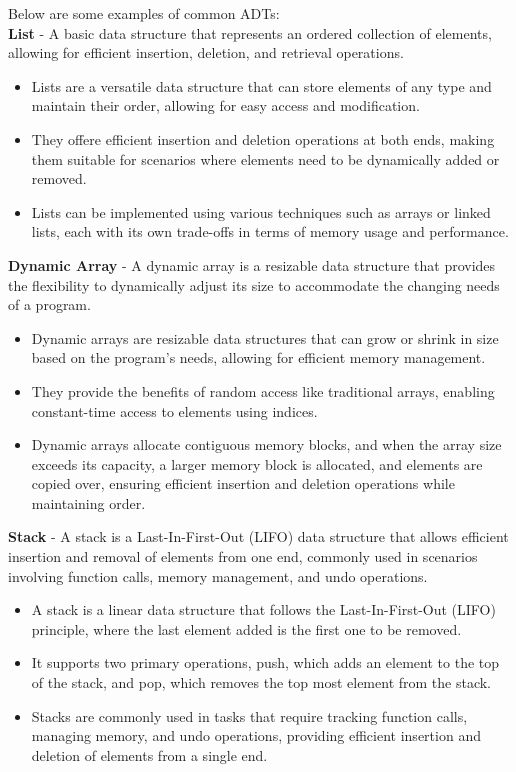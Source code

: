 \begin{solution}
    Below are some examples of common ADTs: \\

    \noindent \textbf{List} - A basic data structure that represents an ordered collection of elements, allowing for efficient insertion, deletion, and retrieval operations.
    \begin{itemize}
        \item Lists are a versatile data structure that can store elements of any type and maintain their order, allowing for easy access and modification.
        \item They offere efficient insertion and deletion operations at both ends, making them suitable for scenarios where elements need to be dynamically added or removed.
        \item Lists can be implemented using various techniques such as arrays or linked lists, each with its own trade-offs in terms of memory usage and performance.
    \end{itemize}

    \noindent \textbf{Dynamic Array} - A dynamic array is a resizable data structure that provides the flexibility to dynamically adjust its size to accommodate the changing
    needs of a program.
    \begin{itemize}
        \item Dynamic arrays are resizable data structures that can grow or shrink in size based on the program's needs, allowing for efficient memory management.
        \item They provide the benefits of random access like traditional arrays, enabling constant-time access to elements using indices.
        \item Dynamic arrays allocate contiguous memory blocks, and when the array size exceeds its capacity, a larger memory block is allocated, and elements are copied over,
        ensuring efficient insertion and deletion operations while maintaining order.
    \end{itemize}

    \noindent \textbf{Stack} - A stack is a Last-In-First-Out (LIFO) data structure that allows efficient insertion and removal of elements from one end, commonly used in scenarios
    involving function calls, memory management, and undo operations.
    \begin{itemize}
        \item A stack is a linear data structure that follows the Last-In-First-Out (LIFO) principle, where the last element added is the first one to be removed.
        \item It supports two primary operations, push, which adds an element to the top of the stack, and pop, which removes the top most element from the stack.
        \item Stacks are commonly used in tasks that require tracking function calls, managing memory, and undo operations, providing efficient insertion and deletion of elements from
        a single end.
    \end{itemize}


\end{solution}
